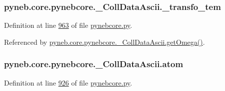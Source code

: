 \hypertarget{classpyneb_1_1core_1_1pynebcore_1_1___coll_data_ascii_aaf268c621d916f4ea71bb5825e249200}{
\subsubsection[{\-\_\-transfo\-\_\-tem}]{\setlength{\rightskip}{0pt plus 5cm}pyneb.\-core.\-pynebcore.\-\_\-\-Coll\-Data\-Ascii.\-\_\-transfo\-\_\-tem\hspace{0.3cm}{\ttfamily [private]}}}\label{classpyneb_1_1core_1_1pynebcore_1_1___coll_data_ascii_aaf268c621d916f4ea71bb5825e249200}


Definition at line \hyperlink{pynebcore_8py_source_l00963}{963} of file \hyperlink{pynebcore_8py_source}{pynebcore.\-py}.



Referenced by \hyperlink{pynebcore_8py_source_l01082}{pyneb.\-core.\-pynebcore.\-\_\-\-Coll\-Data\-Ascii.\-get\-Omega()}.

\hypertarget{classpyneb_1_1core_1_1pynebcore_1_1___coll_data_ascii_a47fdeb51513849a90f420296a0383d33}{
\subsubsection[{atom}]{\setlength{\rightskip}{0pt plus 5cm}pyneb.\-core.\-pynebcore.\-\_\-\-Coll\-Data\-Ascii.\-atom}}\label{classpyneb_1_1core_1_1pynebcore_1_1___coll_data_ascii_a47fdeb51513849a90f420296a0383d33}


Definition at line \hyperlink{pynebcore_8py_source_l00926}{926} of file \hyperlink{pynebcore_8py_source}{pynebcore.\-py}.




